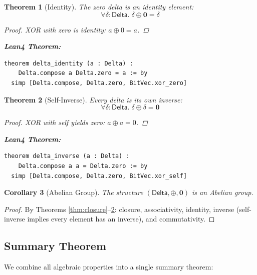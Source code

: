 \documentclass[11pt,letterpaper]{article}
\theoremstyle{plain}
\newtheorem{theorem}{Theorem}[section]
\newtheorem{corollary}[theorem]{Corollary}
\theoremstyle{definition}
\theoremstyle{remark}
\newcommand{\dcompose}{\oplus}           %
\newcommand{\dzero}{\mathbf{0}}          %
\newcommand{\DeltaType}{\mathsf{Delta}}
\begin{document}
\begin{theorem}[Identity]
\label{thm:identity}
The zero delta is an identity element:
\[
\forall \delta : \DeltaType.\; \delta \dcompose \dzero = \delta
\]

\begin{proof}
XOR with zero is identity: $a \oplus 0 = a$.
\end{proof}

\medskip
\noindent\textbf{Lean4 Theorem:}
\begin{lstlisting}
theorem delta_identity (a : Delta) :
    Delta.compose a Delta.zero = a := by
  simp [Delta.compose, Delta.zero, BitVec.xor_zero]
\end{lstlisting}
\end{theorem}

\begin{theorem}[Self-Inverse]
\label{thm:inverse}
Every delta is its own inverse:
\[
\forall \delta : \DeltaType.\; \delta \dcompose \delta = \dzero
\]

\begin{proof}
XOR with self yields zero: $a \oplus a = 0$.
\end{proof}

\medskip
\noindent\textbf{Lean4 Theorem:}
\begin{lstlisting}
theorem delta_inverse (a : Delta) :
    Delta.compose a a = Delta.zero := by
  simp [Delta.compose, Delta.zero, BitVec.xor_self]
\end{lstlisting}
\end{theorem}

\begin{corollary}[Abelian Group]
\label{cor:abelian}
The structure $(\DeltaType, \dcompose, \dzero)$ is an Abelian group.
\end{corollary}

\begin{proof}
By Theorems \ref{thm:closure}--\ref{thm:inverse}: closure, associativity, identity, inverse (self-inverse implies every element has an inverse), and commutativity.
\end{proof}

\subsection{Summary Theorem}

We combine all algebraic properties into a single summary theorem:
\end{document}
